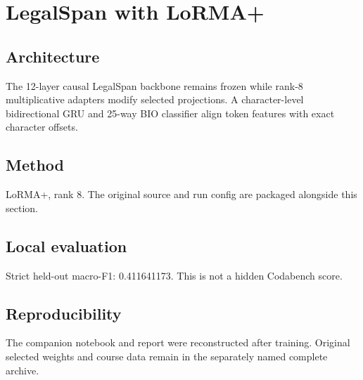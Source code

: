 \section{LegalSpan with LoRMA+}
\subsection{Architecture}
The 12-layer causal LegalSpan backbone remains frozen while rank-8 multiplicative adapters modify selected projections. A character-level bidirectional GRU and 25-way BIO classifier align token features with exact character offsets.
\subsection{Method}
LoRMA+, rank 8. The original source and run config are packaged alongside this section.
\subsection{Local evaluation}
Strict held-out macro-F1: 0.411641173. This is not a hidden Codabench score.
\subsection{Reproducibility}
The companion notebook and report were reconstructed after training. Original selected weights and course data remain in the separately named complete archive.

